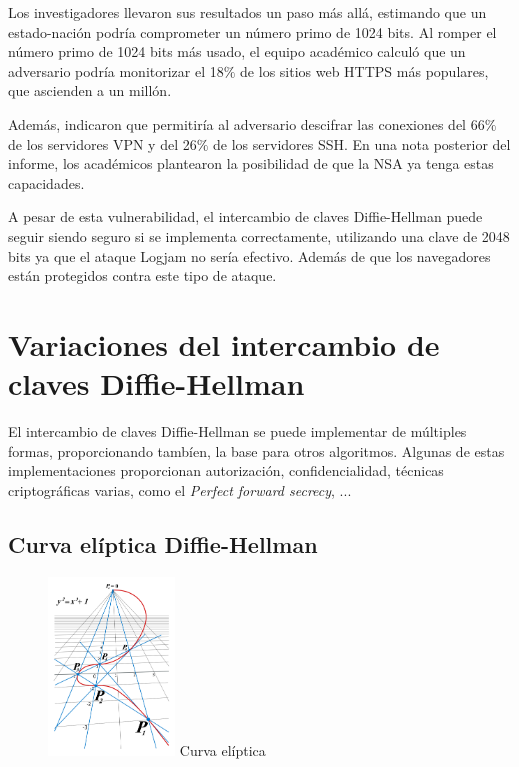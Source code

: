 \documentclass[11pt]{article}
\begin{document}
Los investigadores llevaron sus resultados un paso más allá, estimando que un estado-nación podría comprometer un número primo de 1024 bits. Al romper el número primo de 1024 bits más usado, el equipo académico calculó que un adversario podría monitorizar el 18$\%$ de los sitios web HTTPS más populares, que ascienden a un millón.

Además, indicaron que permitiría al adversario descifrar las conexiones del 66$\%$ de los servidores VPN y del 26$\%$ de los servidores SSH. En una nota posterior del informe, los académicos plantearon la posibilidad de que la NSA ya tenga estas capacidades.

A pesar de esta vulnerabilidad, el intercambio de claves Diffie-Hellman puede seguir siendo seguro si se implementa correctamente, utilizando una clave de 2048 bits ya que el ataque Logjam no sería efectivo. Además de que los navegadores están protegidos contra este tipo de ataque.


\section{Variaciones del intercambio de claves Diffie-Hellman}

El intercambio de claves Diffie-Hellman se puede implementar de múltiples formas, proporcionando tambíen, la base para otros algoritmos. Algunas de estas implementaciones proporcionan autorización, confidencialidad, técnicas criptográficas varias, como el \emph{Perfect forward secrecy}, ...

\newpage

\subsection{Curva elíptica Diffie-Hellman}

\begin{figure} %
    \centering
    \includegraphics[width=0.30\textwidth]{img/curva.jpg}
   	Curva elíptica
\end{figure}
\end{document}
